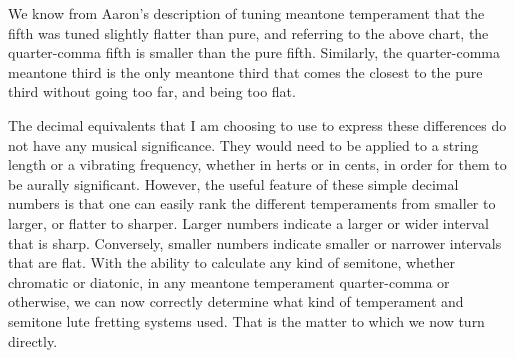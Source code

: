 We know from Aaron's description of tuning meantone temperament that the fifth was tuned
slightly flatter than pure, and referring to the above chart, the quarter-comma fifth is
smaller than the pure fifth.  Similarly, the quarter-comma meantone third is the only
meantone third that comes the closest to the pure third without going too far, and being
too flat.

The decimal equivalents that I am choosing to use to express these differences do not have
any musical significance.  They would need to be applied to a string length or a vibrating
frequency, whether in herts or in cents, in order for them to be aurally significant.
However, the useful feature of these simple decimal numbers is that one can easily rank
the different temperaments from smaller to larger, or flatter to sharper. Larger numbers
indicate a larger or wider interval that is sharp.  Conversely, smaller numbers indicate
smaller or narrower intervals that are flat.  With the ability to calculate any kind of
semitone, whether chromatic or diatonic, in any meantone temperament quarter-comma or
otherwise, we can now correctly determine what kind of temperament and semitone lute
fretting systems used.  That is the matter to which we now turn directly.